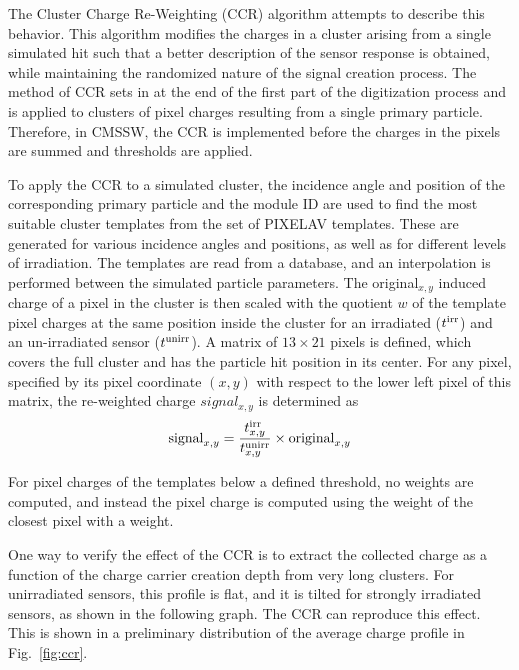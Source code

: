 The Cluster Charge Re-Weighting (CCR) algorithm attempts to describe this behavior.
This algorithm modifies the charges in a cluster arising from a single simulated hit such that a better description of the sensor response is obtained, while maintaining the randomized nature of the signal creation process. 
The method of CCR sets in at the end of the first part of the digitization process and is applied to clusters of pixel charges resulting from a single primary particle. 
Therefore, in CMSSW, the CCR is implemented before the charges in the pixels are summed and thresholds are applied.

To apply the CCR to a simulated cluster, the incidence angle and position of the corresponding primary particle and the module ID are used to find the most suitable cluster templates from the set of PIXELAV templates.
These are generated for various incidence angles and positions, as well as for different levels of irradiation.
The templates are read from a database, and an interpolation is performed between the simulated particle parameters. 
The original$_{x,y}$ induced charge of a pixel in the cluster is then scaled with the quotient $w$ of the template pixel charges at the same position inside the cluster for an irradiated ($t^{\rm irr}$) and an un-irradiated sensor ($t^{\rm unirr}$). 
A matrix of $13\times21$ pixels is defined, which covers the full cluster and has the particle hit position in its center. 
For any pixel, specified by its pixel coordinate $(x,y)$ with respect to the lower left pixel of this matrix, the re-weighted charge $signal_{x,y}$ is determined as
\begin{equation}
    \text{signal}_{x,y} = \frac{t^{\rm irr}_{x,y}}{t^{\rm unirr}_{x,y}} \times \text{original}_{x,y}
\end{equation}

For pixel charges of the templates below a defined threshold, no weights are computed, and instead the pixel charge is computed using the weight of the closest pixel with a weight.

One way to verify the effect of the CCR is to extract the collected charge as a function of the charge carrier creation depth from very long clusters. 
For unirradiated sensors, this profile is flat, and it is tilted for strongly irradiated sensors, as shown in the following graph. 
The CCR can reproduce this effect. This is shown in a preliminary distribution of the average charge profile in Fig.~\ref{fig:ccr}.

